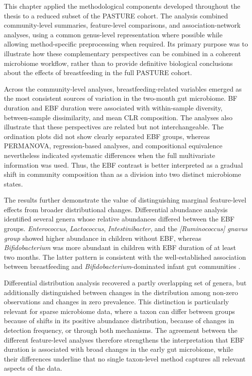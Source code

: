 This chapter applied the methodological components developed throughout the thesis to a reduced subset of the PASTURE cohort. The analysis combined community-level summaries, feature-level comparisons, and association-network analyses, using a common genus-level representation where possible while allowing method-specific preprocessing when required. Its primary purpose was to illustrate how these complementary perspectives can be combined in a coherent microbiome workflow, rather than to provide definitive biological conclusions about the effects of breastfeeding in the full PASTURE cohort.

Across the community-level analyses, breastfeeding-related variables emerged as the most consistent sources of variation in the two-month gut microbiome. BF duration and EBF duration were associated with within-sample diversity, between-sample dissimilarity, and mean CLR composition. The analyses also illustrate that these perspectives are related but not interchangeable. The ordination plots did not show clearly separated EBF groups, whereas PERMANOVA, regression-based analyses, and compositional equivalence nevertheless indicated systematic differences when the full multivariate information was used. Thus, the EBF contrast is better interpreted as a gradual shift in community composition than as a division into two distinct microbiome states.

The results further demonstrate the value of distinguishing marginal feature-level effects from broader distributional changes. Differential abundance analysis identified several genera whose relative abundances differed between the EBF groups. \emph{Enterococcus}, \emph{Lactococcus}, \emph{Intestinibacter}, and the \emph{[Ruminococcus] gnavus group} showed higher abundance in children without EBF, whereas \emph{Bifidobacterium} was more abundant in children with EBF duration of at least two months. The latter pattern is consistent with the well-established association between breastfeeding and \emph{Bifidobacterium}-dominated infant gut communities \citep{backhed2015dynamics,stewart2018temporal}.

Differential distribution analysis recovered a partly overlapping set of genera, but additionally distinguished between changes in the distribution among non-zero observations and changes in zero prevalence. This distinction is particularly relevant for sparse microbiome data, where a taxon can differ between groups because of shifts in its positive abundance distribution, because of changes in detection frequency, or through both mechanisms. The agreement between the different feature-level analyses therefore strengthens the interpretation that EBF duration is associated with broad changes in the early gut microbiome, while their differences underline that no single taxon-level method captures all relevant aspects of the data.

